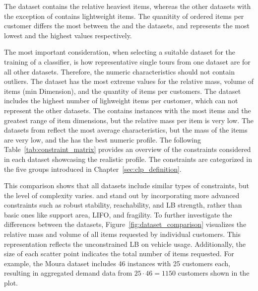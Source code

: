 

The \gendreauDataSetText dataset contains the relative heaviest items, whereas the other datasets with the exception of
\krebsADataSetText contains lightweight items. The quanitity of ordered items per customer differs the most between
the \gendreauDataSetText and the \mouraDataSetText datasets, and represents the most lowest and the highest values
respectively.

The most important consideration, when selecting a suitable dataset for the training of a classifier,
is how representative single tours from one dataset are for all other datasets. Therefore, the numeric characteristics
should not contain outliers. The \gendreauDataSetText dataset has the most extreme values for the relative mass, volume of items (min Dimension),
and the quantity of items per customers. The \mouraDataSetText dataset includes the highest number of lighweight items per customer,
which can not represent the other datasets. The \ceschiaDataSetText contains instances with the most items and the greatest range
of item dimensions, but the relative mass per item is very low. The datasets from \citeauthor*{krebs_advanced_2021}
reflect the most average characteristics, but the mass of the \krebsBDataSetText items are very low, and the \krebsADataSetText
has the best numeric profile. The following Table~\ref{tab:constraint_matrix} provides an overview of the constraints considered
in each dataset showcasing the realistic profile. The constraints are categorized in the five groups introduced
in Chapter~\ref{sec:clp_definition}.



This comparison shows that all datasets include similar types of constraints, but the level
of complexity varies. \krebsADataSetText and \ceschiaDataSetText stand out by incorporating
more advanced constraints such as robust stability, reachability, and LB strength, rather than
basic ones like support area, \gls{LIFO}, and fragility. To further investigate the differences
between the datasets, Figure~\ref{fig:dataset_comparison} visualizes the relative mass and
volume of all items requested by individual customers. This representation reflects the
unconstrained \gls{LB} on vehicle usage. Additionally, the size of each scatter point indicates
the total number of items requested. For example, the Moura dataset includes 46 instances with 25
customers each, resulting in aggregated demand data from $25 \cdot 46 = 1150$ customers shown in
the plot.

